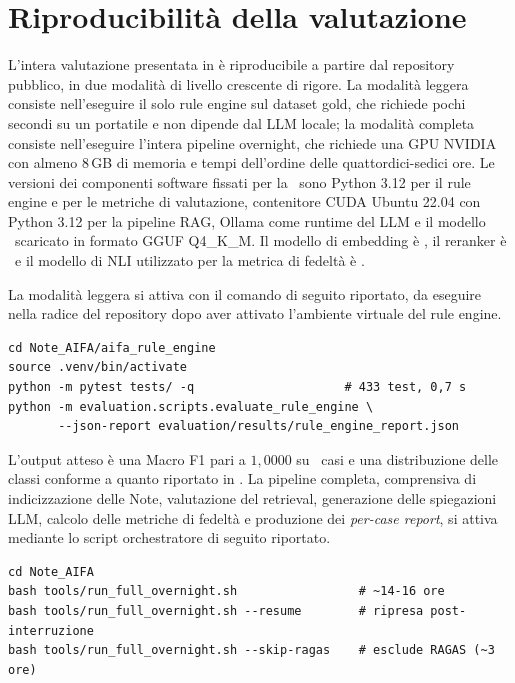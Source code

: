 \chapter{Riproducibilità della valutazione}
\label{app:riproducibilita}

L'intera valutazione presentata in  è riproducibile a partire dal repository pubblico, in due modalità di livello crescente di rigore. La modalità leggera consiste nell'eseguire il solo rule engine sul dataset gold, che richiede pochi secondi su un portatile e non dipende dal LLM locale; la modalità completa consiste nell'eseguire l'intera pipeline overnight, che richiede una GPU NVIDIA con almeno 8\,GB di memoria e tempi dell'ordine delle quattordici-sedici ore. Le versioni dei componenti software fissati per la \cleanroomrun\ sono Python 3.12 per il rule engine e per le metriche di valutazione, contenitore CUDA Ubuntu 22.04 con Python 3.12 per la pipeline RAG, Ollama come runtime del LLM e il modello \llmmodel\ scaricato in formato GGUF Q4\_K\_M. Il modello di embedding è \embedmodel, il reranker è \reranker\ e il modello di NLI utilizzato per la metrica di fedeltà è \nlimodel.

La modalità leggera si attiva con il comando di seguito riportato, da eseguire nella radice del repository dopo aver attivato l'ambiente virtuale del rule engine.

\begin{verbatim}
cd Note_AIFA/aifa_rule_engine
source .venv/bin/activate
python -m pytest tests/ -q                     # 433 test, 0,7 s
python -m evaluation.scripts.evaluate_rule_engine \
       --json-report evaluation/results/rule_engine_report.json
\end{verbatim}

L'output atteso è una Macro F1 pari a $1{,}0000$ su \goldn\ casi e una distribuzione delle classi conforme a quanto riportato in . La pipeline completa, comprensiva di indicizzazione delle Note, valutazione del retrieval, generazione delle spiegazioni LLM, calcolo delle metriche di fedeltà e produzione dei \emph{per-case report}, si attiva mediante lo script orchestratore di seguito riportato.

\begin{verbatim}
cd Note_AIFA
bash tools/run_full_overnight.sh                 # ~14-16 ore
bash tools/run_full_overnight.sh --resume        # ripresa post-interruzione
bash tools/run_full_overnight.sh --skip-ragas    # esclude RAGAS (~3 ore)
\end{verbatim}

